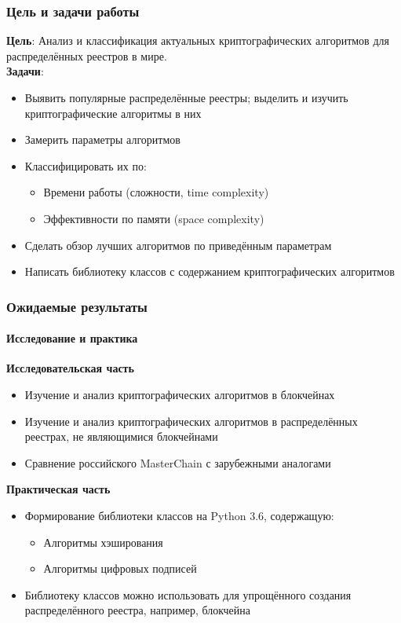 \documentclass{beamer}
\begin{document}
\begin{frame}
    \frametitle{Цель и задачи работы}
    \textbf{Цель}: Анализ и классификация актуальных криптографических
    алгоритмов для распределённых реестров в мире.\\
    \textbf{Задачи}:
    \begin{itemize}
        \item Выявить популярные распределённые реестры; выделить и изучить
              криптографические алгоритмы в них
        \item Замерить параметры алгоритмов
        \item Классифицировать их по:
        \begin{itemize}
            \item Времени работы (сложности, time complexity)
            \item Эффективности по памяти (space complexity)
        \end{itemize}
        \item Сделать обзор лучших алгоритмов по приведённым параметрам
        \item Написать библиотеку классов с содержанием криптографических алгоритмов
\end{itemize}
\end{frame}

\begin{frame}
    \frametitle{Ожидаемые результаты}
    \framesubtitle{Исследование и практика}
    \begin{multicols}{2}
        \textbf{Исследовательская часть}
        \begin{itemize}
            \item Изучение и анализ криптографических алгоритмов в блокчейнах
            \item Изучение и анализ криптографических алгоритмов в
                распределённых реестрах, не являющимися блокчейнами
            \item Сравнение российского MasterChain с зарубежными аналогами
        \end{itemize}
        \bigskip
        \columnbreak
        \textbf{Практическая часть}
        \begin{itemize}
            \item Формирование библиотеки классов на Python 3.6, содержащую:
                    \begin{itemize}
                        \item Алгоритмы хэширования
                        \item Алгоритмы цифровых подписей
                    \end{itemize}
            \item Библиотеку классов можно использовать для упрощённого
                  создания распределённого реестра, например,
                  блокчейна
        \end{itemize}
    \end{multicols}
\end{frame}
\end{document}
